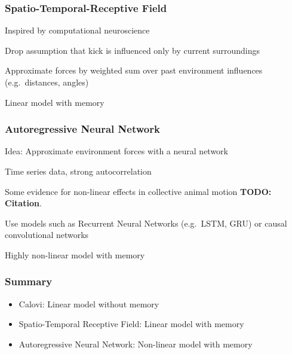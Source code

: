 \documentclass{beamer}
\newcommand{\cn}{\textbf{TODO: Citation}}
\begin{document}
\begin{frame}
  \frametitle{Spatio-Temporal-Receptive Field}
  Inspired by computational neuroscience

  Drop assumption that kick is influenced only by current surroundings
  
  Approximate forces by weighted sum over past environment influences (e.g.\ distances, angles)

  Linear model with memory
\end{frame}

\begin{frame}
  \frametitle{Autoregressive Neural Network}
  Idea: Approximate environment forces with a neural network

  Time series data, strong autocorrelation

  Some evidence for non-linear effects in collective animal motion \cn.

  Use models such as Recurrent Neural Networks (e.g.\ LSTM, GRU) or causal convolutional networks
  
  Highly non-linear model with memory
\end{frame}

\begin{frame}
  \frametitle{Summary}
  \begin{itemize}
  \item Calovi: Linear model without memory
  \item Spatio-Temporal Receptive Field: Linear model with memory
  \item Autoregressive Neural Network: Non-linear model with memory 
  \end{itemize}
\end{frame}
\end{document}
